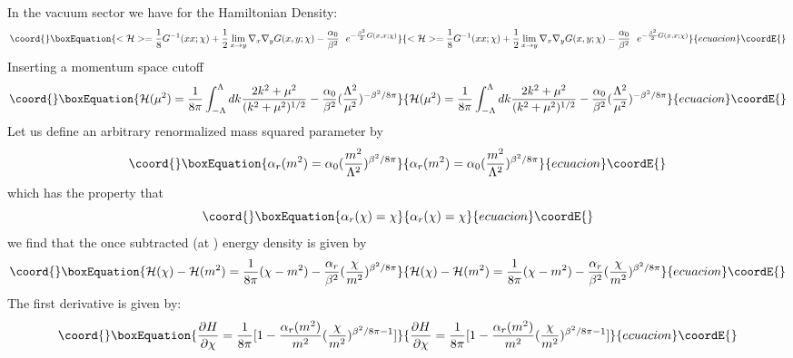 \documentclass[a4paper,prd,preprint,superscriptaddress,showpacs,byrevtex]{revtex4}
\begin{document}
In the vacuum sector we have  for the Hamiltonian Density:
\begin{equation}\coord{}\boxEquation{
< {\cal{H}} > = {1 \over 8} G^{-1}(xx;\chi) + {1 \over 2}
\lim_{x \rightarrow y}  \nabla_x \nabla_y G(x,y;\chi)
 - {\alpha_0 \over \beta^2}~~ e^{- {\beta^2 \over 2} G(x,x;\chi)}
}{
< {\cal{H}} > = {1 \over 8} G^{-1}(xx;\chi) + {1 \over 2}
\lim_{x \rightarrow y}  \nabla_x \nabla_y G(x,y;\chi)
 - {\alpha_0 \over \beta^2}~~ e^{- {\beta^2 \over 2} G(x,x;\chi)}
}{ecuacion}\coordE{}\end{equation}
Inserting a momentum space cutoff \myHighlight{$\Lambda$}\coordHE{}
\begin{equation}\coord{}\boxEquation{
{\cal{H}}(\mu^2) = {1 \over 8 \pi} \int_{-\Lambda}^{\Lambda} dk
{2 k^2 + \mu^2 \over (k^2 + \mu^2)^{1/2} } - {\alpha_0 \over \beta^2}
 ( {\Lambda^2
\over \mu^2})^ {-\beta^2/ 8 \pi}
}{
{\cal{H}}(\mu^2) = {1 \over 8 \pi} \int_{-\Lambda}^{\Lambda} dk
{2 k^2 + \mu^2 \over (k^2 + \mu^2)^{1/2} } - {\alpha_0 \over \beta^2}
 ( {\Lambda^2
\over \mu^2})^ {-\beta^2/ 8 \pi}
}{ecuacion}\coordE{}\end{equation}
Let us define an arbitrary  renormalized mass squared parameter \coordHE{}
by
\begin{equation}\coord{}\boxEquation{
\alpha_r(m^2) = \alpha_0 ({m^2 \over \Lambda^2})^{\beta^2/ 8 \pi}
}{
\alpha_r(m^2) = \alpha_0 ({m^2 \over \Lambda^2})^{\beta^2/ 8 \pi}
}{ecuacion}\coordE{}\end{equation}
which has the property that
\begin{equation}\coord{}\boxEquation{
\alpha_r(\chi) = \chi
}{
\alpha_r(\chi) = \chi
}{ecuacion}\coordE{}\end{equation}
we find that the once subtracted (at \coordHE{}) energy density is given by
\begin{equation}\coord{}\boxEquation{
{\cal{H}}(\chi)-{\cal{H}}(m^2)= {1 \over 8 \pi} (\chi - m^2)
- {\alpha_r \over \beta^2} ({\chi \over m^2})^{\beta^2 / 8 \pi}
}{
{\cal{H}}(\chi)-{\cal{H}}(m^2)= {1 \over 8 \pi} (\chi - m^2)
- {\alpha_r \over \beta^2} ({\chi \over m^2})^{\beta^2 / 8 \pi}
}{ecuacion}\coordE{}\end{equation}
The first derivative is given by:
\begin{equation}\coord{}\boxEquation{
\frac{\partial H}{\partial \chi} = \frac{1}{8 \pi} [1-
\frac{\alpha_r(m^2)}{m^2}
(\frac{\chi}{m^2})^{\beta^2/8 \pi -1}]
}{
\frac{\partial H}{\partial \chi} = \frac{1}{8 \pi} [1-
\frac{\alpha_r(m^2)}{m^2}
(\frac{\chi}{m^2})^{\beta^2/8 \pi -1}]
}{ecuacion}\coordE{}\end{equation}
\end{document}
